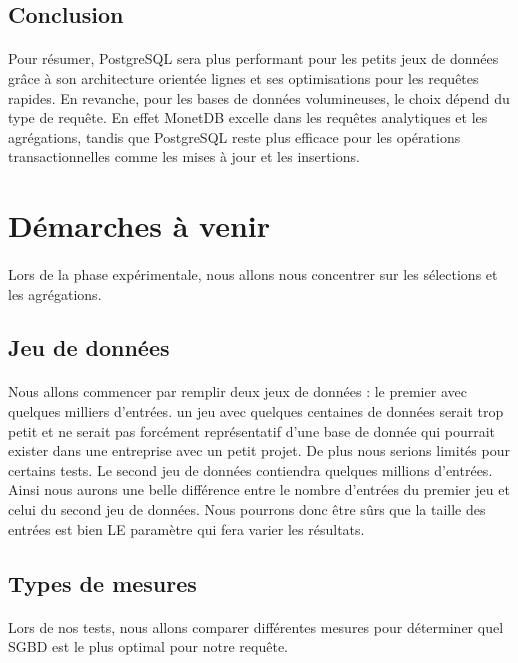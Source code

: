 \documentclass[11pt]{extarticle}
\begin{document}
\subsection{Conclusion}
\paragraph{}
Pour résumer, PostgreSQL sera plus performant pour les petits jeux de données grâce à son architecture orientée lignes et ses optimisations pour les requêtes rapides. En revanche, pour les bases de données volumineuses, le choix dépend du type de requête. En effet MonetDB excelle dans les requêtes analytiques et les agrégations, tandis que PostgreSQL reste plus efficace pour les opérations transactionnelles comme les mises à jour et les insertions.

\section{Démarches à venir}
\paragraph{}
Lors de la phase expérimentale, nous allons nous concentrer sur les sélections et les agrégations.

\subsection{Jeu de données}
\paragraph{}
Nous allons commencer par remplir deux jeux de données : le premier avec quelques milliers d'entrées. un jeu avec quelques centaines de données serait trop petit et ne serait pas forcément représentatif d'une base de donnée qui pourrait exister dans une entreprise avec un petit projet. De plus nous serions limités pour certains tests. Le second jeu de données contiendra quelques millions d'entrées. Ainsi nous aurons une belle différence entre le nombre d'entrées du premier jeu et celui du second jeu de données. Nous pourrons donc être sûrs que la taille des entrées est bien LE paramètre qui fera varier les résultats.

\subsection{Types de mesures}
\paragraph{}
Lors de nos tests, nous allons comparer différentes mesures pour déterminer quel SGBD est le plus optimal pour notre requête.
\end{document}
